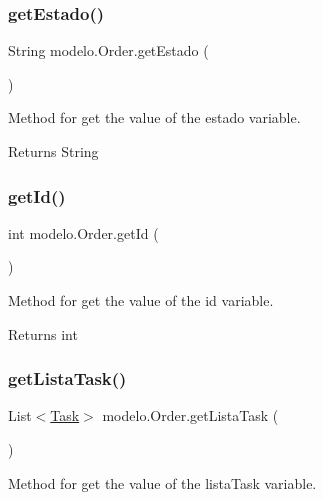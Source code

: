 \subsubsection{\texorpdfstring{get\+Estado()}{getEstado()}}
{\footnotesize\ttfamily String modelo.\+Order.\+get\+Estado (\begin{DoxyParamCaption}{ }\end{DoxyParamCaption})}



Method for get the value of the estado variable. 

\begin{DoxyReturn}{Returns}
String 
\end{DoxyReturn}
\mbox{\label{classmodelo_1_1_order_a6eed9b98ef4db951d02fe77f8f1430b1}} 
\subsubsection{\texorpdfstring{get\+Id()}{getId()}}
{\footnotesize\ttfamily int modelo.\+Order.\+get\+Id (\begin{DoxyParamCaption}{ }\end{DoxyParamCaption})}



Method for get the value of the id variable. 

\begin{DoxyReturn}{Returns}
int 
\end{DoxyReturn}
\mbox{\label{classmodelo_1_1_order_a63df0012d498a6d188e54bae1a355d6e}} 
\subsubsection{\texorpdfstring{get\+Lista\+Task()}{getListaTask()}}
{\footnotesize\ttfamily List$<$\mbox{\hyperlink{classmodelo_1_1_task}{Task}}$>$ modelo.\+Order.\+get\+Lista\+Task (\begin{DoxyParamCaption}{ }\end{DoxyParamCaption})}



Method for get the value of the lista\+Task variable. 

